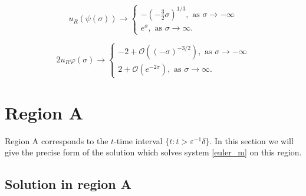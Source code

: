 \documentclass[letterpaper,11pt]{article}
\newcommand{\rmO}{\mathcal{O}}
\newcommand{\eps}{\varepsilon}
\numberwithin{equation}{section}
\theoremstyle{plain}
\begin{document}
\begin{equation*}
u_R(\psi(\sigma)) \to \begin{cases}
 -(-\frac{3}{2}\sigma)^{1/3}, \text{ as }\sigma \to -\infty\\
e^{\sigma} , \text{ as }\sigma \to \infty.
\end{cases}
\end{equation*}

\begin{equation*}
2u_R\varphi(\sigma) \to\begin{cases}
-2+ \rmO((-\sigma)^{-3/2}), \text{ as }\sigma \to -\infty\\
2+ \rmO(e^{-2\sigma}), \text{ as }\sigma \to \infty.
\end{cases}
\end{equation*}
%
\fi

\section{Region A}\label{sec_A}

Region A corresponds to the $t$-time interval $\{ t : t > \eps^{-1}\delta\}$. In this section we will give the precise form of the solution which solves system \eqref{euler_m} on this region.

\subsection{Solution in region A}
\end{document}

